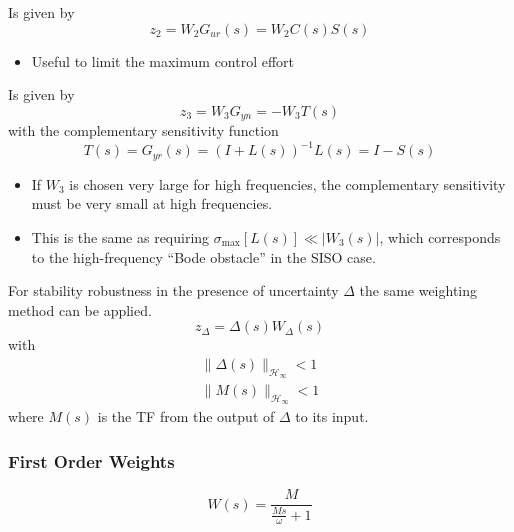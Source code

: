 \newpar{}


Is given by
\begin{equation*}
    z_2=W_2 G_{ur}(s) = W_2 C(s) S(s)
\end{equation*}
\begin{itemize}
    \item Useful to limit the maximum control effort
\end{itemize}

\newpar{}


Is given by
\begin{equation*}
    z_3= W_3 G_{yn} =-W_3 T(s)
\end{equation*}
with the complementary sensitivity function
\begin{equation*}
    T(s) = G_{yr}(s)={(I+L(s))}^{-1}L(s) = I-S(s)
\end{equation*}
\begin{itemize}
    \item If $W_3$ is chosen very large for high frequencies, the complementary sensitivity must be very small at high frequencies.
    \item This is the same as requiring $\sigma_{\max}[L(s)] \ll |W_3(s)|$, which corresponds to the high-frequency ``Bode obstacle'' in the SISO case.
\end{itemize}

\newpar{}


For stability robustness in the presence of uncertainty $\Delta$ the same weighting method can be applied.
\begin{equation*}
    z_\Delta = \Delta(s)W_\Delta(s)
\end{equation*}
with
\begin{gather*}
    \|\Delta(s)\|_{\mathcal{H}_\infty} < 1 \\
    \|M(s)\|_{\mathcal{H}_\infty} < 1
\end{gather*}
where $M(s)$ is the TF from the output of $\Delta$ to its input.

\subsubsection{First Order Weights}
\begin{equation*}
    W(s) = \frac{M}{\frac{Ms}{\omega}+1}
\end{equation*}

